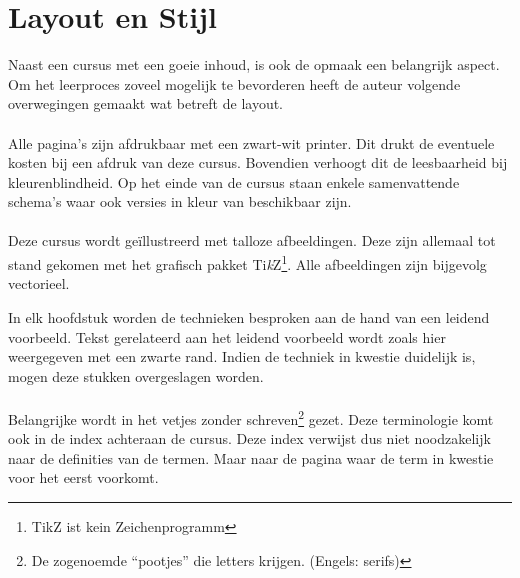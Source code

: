\section*{Layout en Stijl}
Naast een cursus met een goeie inhoud, is ook de opmaak een belangrijk aspect. Om het leerproces zoveel mogelijk te bevorderen heeft de auteur volgende overwegingen gemaakt wat betreft de layout.
\paragraph{}
Alle pagina's zijn afdrukbaar met een zwart-wit printer. Dit drukt de eventuele kosten bij een afdruk van deze cursus. Bovendien verhoogt dit de leesbaarheid bij kleurenblindheid. Op het einde van de cursus staan enkele samenvattende schema's waar ook versies in kleur van beschikbaar zijn.
\paragraph{}
Deze cursus wordt geïllustreerd met talloze afbeeldingen. Deze zijn allemaal tot stand gekomen met het grafisch pakket Ti\textit{k}Z\footnote{TikZ ist kein Zeichenprogramm}. Alle afbeeldingen zijn bijgevolg vectorieel.
\begin{leftbar}
In elk hoofdstuk worden de technieken besproken aan de hand van een leidend voorbeeld. Tekst gerelateerd aan het leidend voorbeeld wordt zoals hier weergegeven met een zwarte rand. Indien de techniek in kwestie duidelijk is, mogen deze stukken overgeslagen worden.
\end{leftbar}
\paragraph{}
Belangrijke  wordt in het vetjes zonder schreven\footnote{De zogenoemde ``pootjes'' die letters krijgen. (Engels: serifs)} gezet. Deze terminologie komt ook in de index achteraan de cursus. Deze index verwijst dus niet noodzakelijk naar de definities van de termen. Maar naar de pagina waar de term in kwestie voor het eerst voorkomt.
\begin{figure}[H]
\centering
{}
\end{figure}
